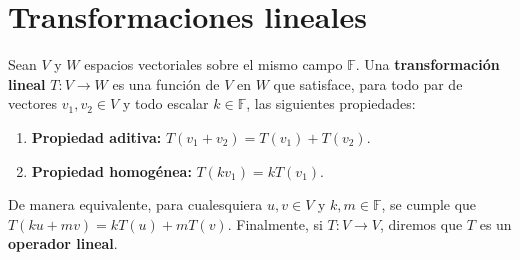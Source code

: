 \section{Transformaciones lineales}
\begin{definition} \label{defTL}
Sean $V$ y $W$ espacios vectoriales sobre el mismo campo $\mathbb{F}$. Una \textbf{transformación lineal} $T:V\rightarrow W$ es una función de $V$ en $W$ que satisface, para todo par de vectores $v_1, v_2 \in V$ y todo escalar $k \in \mathbb{F}$, las siguientes propiedades:
\begin{enumerate}[$1.$]
    \item \textbf{Propiedad aditiva:} $T(v_1 + v_2) = T(v_1) + T(v_2)$.
    \item \textbf{Propiedad homogénea:} $T(k v_1) = k T(v_1)$.
\end{enumerate}
De manera equivalente, para cualesquiera $u, v \in V$ y $k, m \in \mathbb{F}$, se cumple que $T(k u + m v) = k T(u) + m T(v)$. Finalmente, si $T:V\rightarrow V$, diremos que $T$ es un \textbf{operador lineal}.
\end{definition}


